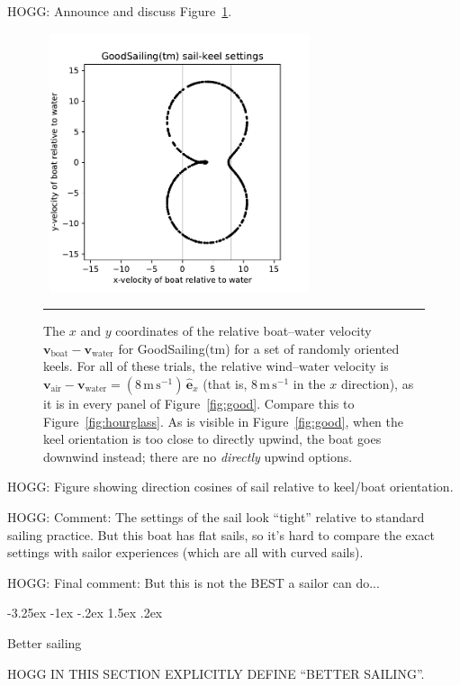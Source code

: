 \documentclass[letterpaper]{article}
\makeatletter
\renewcommand{\vec}[1]{\boldsymbol{#1}}
\newcommand{\uvec}{\vec{\hat{e}}}
\newcommand{\air}{\text{air}}
\newcommand{\water}{\text{water}}
\newcommand{\boat}{\text{boat}}
\newcommand{\vair}{\vec{v}_\air}
\newcommand{\vwater}{\vec{v}_\water}
\newcommand{\vboat}{\vec{v}_\boat}
\newcommand{\mps}{\mathrm{m\,s^{-1}}}
\newcommand{\figref}[1]{Figure~\ref{#1}}
\renewcommand\section{\@startsection {section}{1}{\z@}%
  {-3.25ex \@plus -1ex \@minus -.2ex}%
  {1.5ex \@plus .2ex}%
  {\raggedright\normalfont\large\bfseries}}
\newcommand{\figurerule}{\rule[1ex]{\textwidth}{0.2pt}}
\makeatother
\begin{document}
HOGG: Announce and discuss \figref{fig:hourgood}.
\begin{figure}[t!]
  ~\hfill\includegraphics[width=3in]{hourglass-good.pdf}\hfill~
  \caption{The $x$ and $y$ coordinates of the relative boat--water velocity $\vboat-\vwater$ for GoodSailing(tm) for a set of randomly oriented keels.
  For all of these trials, the relative wind--water velocity is $\vair-\vwater=(8\,\mps)\,\uvec_x$ (that is, $8\,\mps$ in the $x$ direction), as it is in every panel of \figref{fig:good}.
  Compare this to \figref{fig:hourglass}.
  As is visible in \figref{fig:good}, when the keel orientation is too close to directly upwind, the boat goes downwind instead; there are no \emph{directly} upwind options.\label{fig:hourgood}}
  \figurerule
\end{figure}

HOGG: Figure showing direction cosines of sail relative to keel/boat orientation.

HOGG: Comment: The settings of the sail look ``tight'' relative to standard sailing practice. But this boat has flat sails, so it's hard to compare the exact settings with sailor experiences (which are all with curved sails).

HOGG: Final comment: But this is not the BEST a sailor can do...

\section{Better sailing}\label{sec:better}

HOGG IN THIS SECTION EXPLICITLY DEFINE ``BETTER SAILING''.
\end{document}
